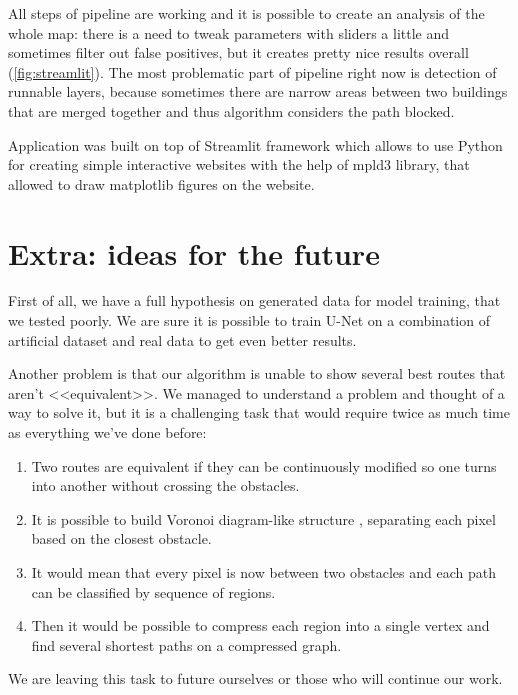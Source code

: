 \documentclass[a4paper,12pt]{extarticle}
\begin{document}
All steps of pipeline are working and it is possible to create an analysis of the whole map: there is a need to tweak parameters with sliders a little and sometimes filter out false positives, but it creates pretty nice results overall (\cref{fig:streamlit}).
The most problematic part of pipeline right now is detection of runnable layers, because sometimes there are narrow areas between two buildings that are merged together and thus algorithm considers the path blocked. 

Application was built on top of Streamlit \cite{streamlit} framework which allows to use Python for creating simple interactive websites with the help of mpld3 \cite{mpld3} library, that allowed to draw matplotlib figures on the website.

\section{Extra: ideas for the future}

First of all, we have a full hypothesis on generated data for model training, that we tested poorly.
We are sure it is possible to train U-Net on a combination of artificial dataset and real data to get even better results.

Another problem is that our algorithm is unable to show several best routes that aren’t <<equivalent>>.
We managed to understand a problem and thought of a way to solve it, but it is a challenging task that would require twice as much time as everything we've done before:
\begin{enumerate}
    \item Two routes are equivalent if they can be continuously modified so one turns into another without crossing the obstacles.
    \item It is possible to build Voronoi diagram-like structure \cite{voronoipolygon}, separating each pixel based on the closest obstacle.
    \item It would mean that every pixel is now between two obstacles and each path can be classified by sequence of regions.
    \item Then it would be possible to compress each region into a single vertex and find several shortest paths on a compressed graph.
\end{enumerate}

We are leaving this task to future ourselves or those who will continue our work.
\end{document}
